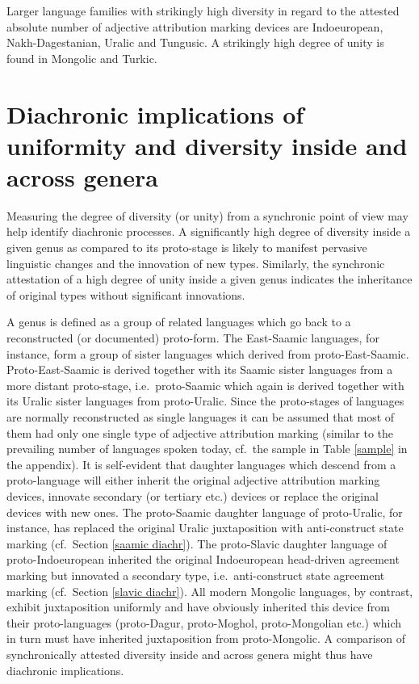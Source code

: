 Larger language families with strikingly high diversity in regard to the attested absolute number of adjective attribution marking devices are Indoeuropean, Nakh-Dagestanian, Uralic and Tungusic. A strikingly high degree of unity is found in Mongolic and Turkic.

\section[Diachronic implications]{Diachronic implications of uniformity and diversity inside and across genera}
Measuring the degree of diversity (or unity) from a synchronic point of view may help identify diachronic processes. A significantly high degree of diversity inside a given genus as compared to its proto-stage is likely to manifest pervasive linguistic changes and the innovation of new types. Similarly, the synchronic attestation of a high degree of unity inside a given genus indicates the inheritance of original types without significant innovations. 

A genus is defined as a group of related languages which go back to a reconstructed (or documented) proto-form. The East-Saamic languages, for instance, form a group of sister languages which derived from proto-East-Saamic. Proto-East-Saamic is derived together with its Saamic sister languages from a more distant proto-stage, i.e.~proto-Saamic which again is derived together with its Uralic sister languages from proto-Uralic. Since the proto-stages of languages are normally reconstructed as single languages it can be assumed that most of them had only one single type of adjective attribution marking (similar to the prevailing number of languages spoken today, cf.~the sample in Table \ref{sample} in the appendix). It is self-evident that daughter languages which descend from a proto-language will either inherit the original adjective attribution marking devices, innovate secondary (or tertiary etc.) devices or replace the original devices with new ones. The proto-Saamic daughter language of proto-Uralic, for instance, has replaced the original Uralic juxtaposition with anti-construct state marking (cf.~Section \ref{saamic diachr}). The proto-Slavic daughter language of proto-Indoeuropean inherited the original Indoeuropean head-driven agreement marking but innovated a secondary type, i.e.~anti-construct state agreement marking (cf.~Section \ref{slavic diachr}). All modern Mongolic languages, by contrast, exhibit juxtaposition uniformly and have obviously inherited this device from their proto-languages (proto-Dagur, proto-Moghol, proto-Mongolian etc.) which in turn must have inherited juxtaposition from proto-Mongolic. A comparison of synchronically attested diversity inside and across genera might thus have diachronic implications.

